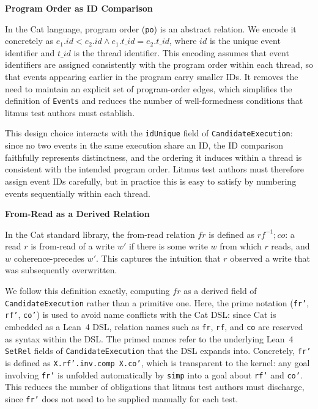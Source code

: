 \textbf{Program Order as ID Comparison}

In the Cat language, program order (\texttt{po}) is an abstract relation. We encode it concretely as $e_1.\mathit{id} < e_2.\mathit{id} \wedge e_1.\mathit{t\_id} = e_2.\mathit{t\_id}$, where $\mathit{id}$ is the unique event identifier and $\mathit{t\_id}$ is the thread identifier. This encoding assumes that event identifiers are assigned consistently with the program order within each thread, so that events appearing earlier in the program carry smaller IDs. It removes the need to maintain an explicit set of program-order edges, which simplifies the definition of \texttt{Events} and reduces the number of well-formedness conditions that litmus test authors must establish.

This design choice interacts with the \texttt{idUnique} field of \texttt{CandidateExecution}: since no two events in the same execution share an ID, the ID comparison faithfully represents distinctness, and the ordering it induces within a thread is consistent with the intended program order. Litmus test authors must therefore assign event IDs carefully, but in practice this is easy to satisfy by numbering events sequentially within each thread.

\textbf{From-Read as a Derived Relation}

In the Cat standard library, the from-read relation $\mathit{fr}$ is defined as $\mathit{rf}^{-1}; \mathit{co}$: a read $r$ is from-read of a write $w'$ if there is some write $w$ from which $r$ reads, and $w$ coherence-precedes $w'$. This captures the intuition that $r$ observed a write that was subsequently overwritten.

We follow this definition exactly, computing $\mathit{fr}$ as a derived field of \texttt{CandidateExecution} rather than a primitive one. Here, the prime notation (\texttt{fr'}, \texttt{rf'}, \texttt{co'}) is used to avoid name conflicts with the Cat DSL: since Cat is embedded as a Lean~4 DSL, relation names such as \texttt{fr}, \texttt{rf}, and \texttt{co} are reserved as syntax within the DSL. The primed names refer to the underlying Lean~4 \texttt{SetRel} fields of \texttt{CandidateExecution} that the DSL expands into. Concretely, \texttt{fr'} is defined as \texttt{X.rf'.inv.comp X.co'}, which is transparent to the kernel: any goal involving \texttt{fr'} is unfolded automatically by \texttt{simp} into a goal about \texttt{rf'} and \texttt{co'}. This reduces the number of obligations that litmus test authors must discharge, since \texttt{fr'} does not need to be supplied manually for each test.

